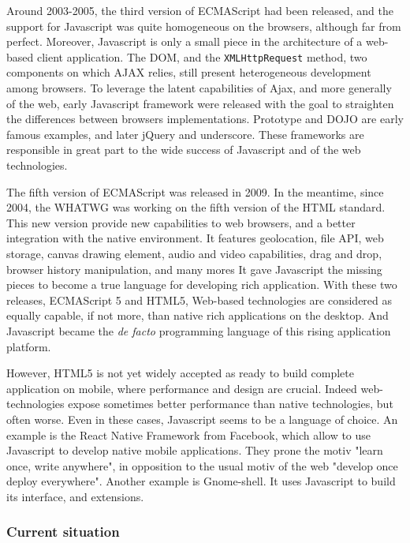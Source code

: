 Around 2003-2005, the third version of ECMAScript had been released, and the support for Javascript was quite homogeneous on the browsers, although far from perfect.
Moreover, Javascript is only a small piece in the architecture of a web-based client application.
The DOM, and the \texttt{XMLHttpRequest} method, two components on which AJAX relies, still present heterogeneous development among browsers.
To leverage the latent capabilities of Ajax, and more generally of the web, early Javascript framework were released with the goal to straighten the differences between browsers implementations.
Prototype and DOJO are early famous examples, and later jQuery and underscore.
These frameworks are responsible in great part to the wide success of Javascript and of the web technologies.

The fifth version of ECMAScript was released in 2009.
In the meantime, since 2004, the WHATWG was working on the fifth version of the HTML standard.
This new version provide new capabilities to web browsers, and a better integration with the native environment.
It features geolocation, file API, web storage, canvas drawing element, audio and video capabilities, drag and drop, browser history manipulation, and many mores
It gave Javascript the missing pieces to become a true language for developing rich application.
With these two releases, ECMAScript 5 and HTML5, Web-based technologies are considered as equally capable, if not more, than native rich applications on the desktop.
And Javascript became the \textit{de facto} programming language of this rising application platform.

However, HTML5 is not yet widely accepted as ready to build complete application on mobile, where performance and design are crucial.
Indeed web-technologies expose sometimes better performance than native technologies, but often worse.
Even in these cases, Javascript seems to be a language of choice.
An example is the React Native Framework from Facebook, which allow to use Javascript to develop native mobile applications.
They prone the motiv "learn once, write anywhere", in opposition to the usual motiv of the web "develop once deploy everywhere".
Another example is Gnome-shell. It uses Javascript to build its interface, and extensions.

\subsubsection{Current situation}

